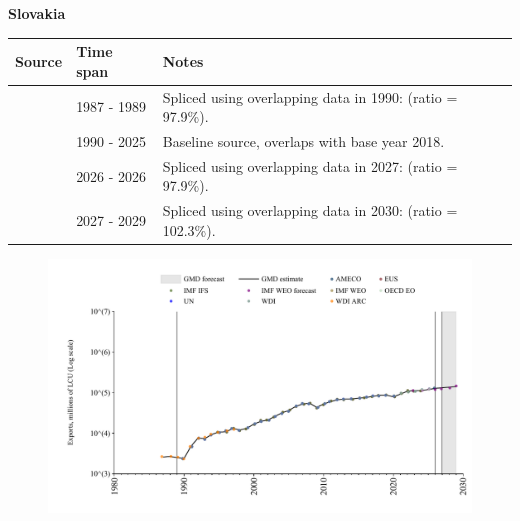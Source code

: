 \documentclass[12pt,a4paper,landscape]{article}
\begin{document}
\begin{adjustbox}{max totalsize={\paperwidth}{\paperheight},center}
\begin{minipage}[t][\textheight][t]{\textwidth}
\vspace*{0.5cm}
{}
\begin{center}
{\Large\bfseries Slovakia}
\end{center}
\vspace{0.5cm}
\begin{table}[H]
\centering
\small
\begin{tabular}{|l|l|l|}
\hline
\textbf{Source} & \textbf{Time span} & \textbf{Notes} \\
\hline
\rowcolor{white}\cite{WDI_ARC}& 1987 - 1989 &Spliced using overlapping data in 1990: (ratio = 97.9\%).\\
\rowcolor{lightgray}\cite{OECD_EO}& 1990 - 2025 &Baseline source, overlaps with base year 2018.\\
\rowcolor{white}\cite{AMECO}& 2026 - 2026 &Spliced using overlapping data in 2027: (ratio = 97.9\%).\\
\rowcolor{lightgray}\cite{IMF_WEO_forecast}& 2027 - 2029 &Spliced using overlapping data in 2030: (ratio = 102.3\%).\\
\hline
\end{tabular}
\end{table}
\begin{figure}[H]
\centering
\includegraphics[width=\textwidth,height=0.6\textheight,keepaspectratio]{graphs/SVK_exports.pdf}
\end{figure}
\end{minipage}
\end{adjustbox}
\end{document}
